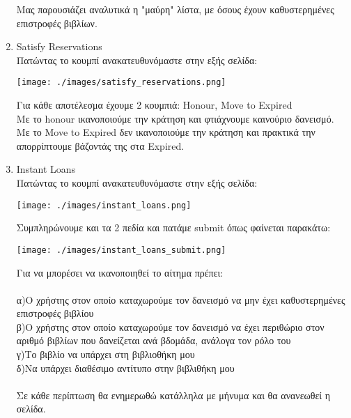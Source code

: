 \documentclass[14pt]{report}
\begin{document}
\begin{enumerate}
		\vspace{\baselineskip}
		
		Μας παρουσιάζει αναλυτικά η "μαύρη" λίστα, με όσους έχουν καθυστερημένες επιστροφές βιβλίων.
		
		\newpage
		\hypertarget{o-satisfy-res}{}
		\item Satisfy Reservations \\
		Πατώντας το κουμπί ανακατευθυνόμαστε στην εξής σελίδα: \\
		
		\vspace{\baselineskip}
		
		\texttt{[image: ./images/satisfy\_reservations.png]}
		
		\vspace{\baselineskip}
		
		Για κάθε αποτέλεσμα έχουμε 2 κουμπιά: Honour, Move to Expired \\
		Με το honour ικανοποιούμε την κράτηση και φτιάχνουμε καινούριο δανεισμό. \\
		Με το Move to Expired δεν ικανοποιούμε την κράτηση και πρακτικά την απορρίπτουμε βάζοντάς της στα Expired. \\
		
		\newpage
		\hypertarget{o-instant-loans}{}
		\item Instant Loans \\
		Πατώντας το κουμπί ανακατευθυνόμαστε στην εξής σελίδα: \\
		
		\vspace{\baselineskip}
		
		\texttt{[image: ./images/instant\_loans.png]}
		
		\vspace{\baselineskip}
		
		\newpage
		Συμπληρώνουμε και τα 2 πεδία και πατάμε submit όπως φαίνεται παρακάτω: \\
		
		\vspace{\baselineskip}
		
		\texttt{[image: ./images/instant\_loans\_submit.png]}
		
		\vspace{\baselineskip}
		
		Για να μπορέσει να ικανοποιηθεί το αίτημα πρέπει: \\ \\
		α)Ο χρήστης στον οποίο καταχωρούμε τον δανεισμό να μην έχει καθυστερημένες επιστροφές βιβλίου \\
		β)Ο χρήστης στον οποίο καταχωρούμε τον δανεισμό να έχει περιθώριο στον αριθμό βιβλίων που δανείζεται ανά βδομάδα, ανάλογα τον ρόλο του \\
		γ)Το βιβλίο να υπάρχει στη βιβλιοθήκη μου \\
		δ)Να υπάρχει διαθέσιμο αντίτυπο στην βιβλιθήκη μου \\ \\
		Σε κάθε περίπτωση θα ενημερωθώ κατάλληλα με μήνυμα και θα ανανεωθεί η σελίδα. \\
		

\end{enumerate}
\end{document}
